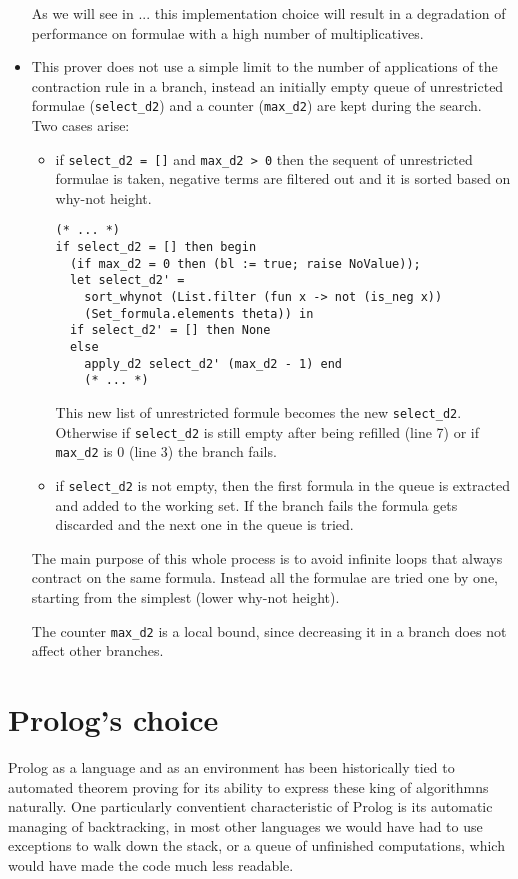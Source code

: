 \documentclass[a4paper, 12pt, tesi, english]{report}
\begin{document}
\begin{itemize}
		As we will see in ... %
		this implementation choice will result in a degradation of performance on formulae with a high number of multiplicatives.
	\item This prover does not use a simple limit to the number of applications of the contraction rule in a branch, instead an initially empty queue of unrestricted formulae (\texttt{select\_d2}) and a counter (\texttt{max\_d2}) are kept during the search.
		Two cases arise:
		\begin{itemize}
			\item if \texttt{select\_d2 = []} and \texttt{max\_d2 > 0} then the sequent of unrestricted formulae is taken, negative terms are filtered out and it is sorted based on why-not height.	%
				\begin{lstlisting}[language=caml]
(* ... *)
if select_d2 = [] then begin
  (if max_d2 = 0 then (bl := true; raise NoValue));                    
  let select_d2' = 
    sort_whynot (List.filter (fun x -> not (is_neg x)) 
    (Set_formula.elements theta)) in
  if select_d2' = [] then None
  else
    apply_d2 select_d2' (max_d2 - 1) end
    (* ... *)
				\end{lstlisting}
				This new list of unrestricted formule becomes the new \texttt{select\_d2}.
				Otherwise if \texttt{select\_d2} is still empty after being refilled (line 7) or if \texttt{max\_d2} is 0 (line 3) the branch fails.
			\item if \texttt{select\_d2} is not empty, then the first formula in the queue is extracted and added to the working set.	%
				If the branch fails the formula gets discarded and the next one in the queue is tried.	%
		\end{itemize}
		The main purpose of this whole process is to avoid infinite loops that always contract on the same formula.
		Instead all the formulae are tried one by one, starting from the simplest (lower why-not height).

		The counter \texttt{max\_d2} is a local bound, since decreasing it in a branch does not affect other branches.
\end{itemize}


\section{Prolog's choice}
Prolog as a language and as an environment has been historically tied to automated theorem proving for its ability to express these king of algorithmns naturally.
One particularly conventient characteristic of Prolog is its automatic managing of backtracking, in most other languages we would have had to use exceptions to walk down the stack, or a queue of unfinished computations, which would have made the code much less readable.
\end{document}
